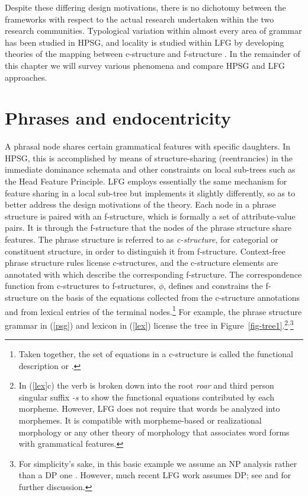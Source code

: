 Despite these differing design motivations, there is no dichotomy between the frameworks with respect to the actual research undertaken within the two research communities.  Typological variation within almost every area of grammar has been studied in HPSG, and locality is studied within LFG by developing theories of the mapping between c-structure and f-structure  \citep[see][88--128]{BATW2016a}.   In the remainder of this chapter we will survey various phenomena and compare HPSG and LFG approaches.


\section{Phrases and endocentricity} 
A phrasal node shares certain grammatical features with specific daughters. %
In HPSG, this is accomplished
by means of structure-sharing (reentrancies) in the immediate dominance schemata and other 
constraints on local sub-trees such as the Head Feature Principle.  LFG employs essentially the same mechanism for feature sharing in a local sub-tree but implements it slightly differently, so as to better address the design motivations of the theory.  Each node in a phrase structure is paired with an f-structure, which is formally a set of attribute-value pairs.  It is through the f-structure that the nodes of the phrase structure share features.   The phrase structure is referred to as \textit{c-structure}, for categorial or constituent structure, in order to distinguish it from f-structure. 
Context-free phrase structure rules  license c-structures, and the c-structure elements are annotated with  which describe the corresponding f-structure.  
The correspondence function from c-structures to f-structures, $\phi$, defines and constrains the f-structure on the basis of the  equations collected from the c-structure annotations and from lexical entries of the terminal nodes.\footnote{Taken together, the set of equations in a c-structure is called the functional description or .}  For example, the phrase structure grammar in (\ref{psg}) and lexicon in (\ref{lex}) license the tree in Figure~\ref{fig-tree1}.\footnote{In (\ref{lex}c) the verb is broken down into the root \textit{roar} and third person singular suffix \textit{-s} to show the functional equations contributed by each morpheme.  However, LFG does not require that words be analyzed into morphemes.  It is compatible with morpheme-based \citep[e.g.,][384--385, 395--396]{ishikawa85,BATW2016a} or realizational morphology   \citep[Chapter 12]{dalrymple;ea19} or any other theory of morphology that associates word forms with grammatical features.}$^,$\footnote{For simplicity's sake, in this basic example we assume an NP analysis rather than a DP one \citep{Brame82a}. However, much recent LFG work assumes DP; see \citet{BATW2016a} and \citet{dalrymple;ea19} for further discussion.}

